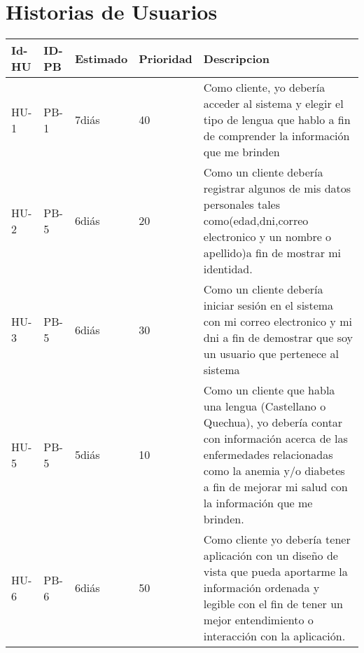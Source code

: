 \chapter{Historias de Usuarios}
\begin{table}[htbp]
	\begin{center}
		\begin{tabular}{| p{1.6cm}| p{1.8cm}| p{1.8cm}|p{1.8cm} |p{7.8cm} |}
			\hline
		\textbf{Id-HU} & \textbf{ID-PB} & \textbf {Estimado}& \textbf{Prioridad} & \textbf{Descripcion}
		\\\hline  
 		HU-1&PB-1& 7diás& 40&Como cliente, yo debería acceder al sistema y elegir el tipo de lengua que hablo a fin de comprender la información que me brinden
 \\ \hline
 	 	HU-2&PB-5& 6diás& 20&Como un cliente debería registrar algunos de mis datos personales tales como(edad,dni,correo electronico y un nombre o apellido)a fin de mostrar mi identidad.
 	 	 \\ \hline
 	 	HU-3&PB-5& 6diás& 30&Como un cliente debería iniciar sesión en el sistema con mi correo electronico y mi dni a fin de demostrar que soy un usuario que pertenece al sistema 
 \\ \hline
	 	HU-5&PB-5& 5diás& 10&Como un cliente que habla una lengua (Castellano o Quechua), yo debería contar con información acerca de las enfermedades relacionadas como la anemia y/o diabetes a fin de mejorar mi salud con la información que me brinden. 
 \\ \hline
 		HU-6&PB-6& 6diás&50&Como cliente yo debería tener aplicación con un diseño de vista que pueda aportarme la información ordenada y legible con el fin de tener un mejor entendimiento o interacción con la aplicación.
  \\ \hline
		\end{tabular}
\end{center}
\end{table}